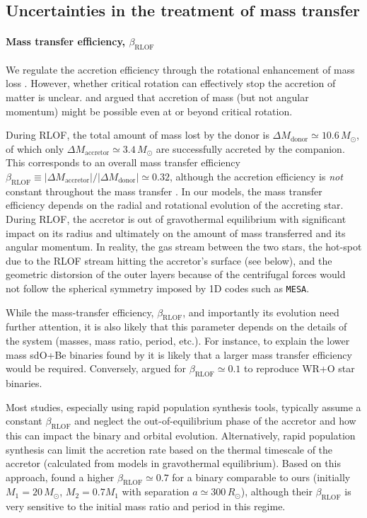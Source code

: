 \documentclass[twocolumn,twocolappendix,trackchanges]{aastex63}
\begin{document}
\subsection{Uncertainties in the treatment of mass transfer}
\label{sec:bin_param}

\paragraph{Mass transfer efficiency, $\beta_\mathrm{RLOF}$}
We regulate the accretion efficiency through the rotational
enhancement of mass loss \citep[e.g.,][]{langer:98, petrovic:05, wang:20}.  However, whether
critical rotation can effectively stop the accretion of matter is
unclear. \cite{popham:91} and \cite{paczynski:91} argued that
accretion of mass (but not angular momentum) might be possible even at
or beyond critical rotation.

During RLOF, the total amount of mass lost by the donor is
$\Delta M_\mathrm{donor} \simeq 10.6\,M_\odot$, of which only
$\Delta M_\mathrm{accretor}\simeq 3.4\,M_\odot$ are successfully
accreted by the companion. This corresponds to an overall mass
transfer efficiency
$\beta_\mathrm{RLOF}\equiv |\Delta M_\mathrm{accretor}|/|\Delta M_\mathrm{donor}| \simeq 0.32$,
although the accretion efficiency is \emph{not} constant throughout
the mass transfer \citep[e.g.,][]{vanrensbergen:06}. In our models,
the mass transfer efficiency depends on the radial and rotational
evolution of the accreting star. During RLOF, the accretor is out of
gravothermal equilibrium with significant impact on its radius and
ultimately on the amount of mass transferred and its angular
momentum. In reality, the gas stream between the two stars, the
hot-spot due to the RLOF stream hitting the accretor's surface (see
below), and the geometric distorsion of the outer layers because of
the centrifugal forces would not follow the spherical symmetry imposed
by 1D codes such as \texttt{MESA}.

While the mass-transfer efficiency, $\beta_\mathrm{RLOF}$, and
importantly its evolution need further attention, it is also
likely that this parameter depends on the details of
the system (masses, mass ratio, period, etc.). For instance, to
explain the lower mass sdO+Be binaries found by \cite{wang:21_sdOBe}
it is likely that a larger mass transfer efficiency would be
required. Conversely, \cite{petrovic:05} argued for
$\beta_\mathrm{RLOF}\simeq 0.1$ to reproduce WR+O star binaries.


Most studies, especially using rapid population synthesis tools,
typically assume a constant $\beta_\mathrm{RLOF}$ and neglect the
out-of-equilibrium phase of the accretor and how this can impact the
binary and orbital evolution. Alternatively, rapid population
synthesis can limit the accretion rate based on the thermal timescale
of the accretor (calculated from models in gravothermal
equilibrium). Based on this approach, \cite{schneider:15} found a
higher $\beta_\mathrm{RLOF}\simeq 0.7$ for a binary comparable to ours
(initially $M_1=20\,M_\odot$, $M_2=0.7M_1$ with separation
$a\simeq300\,R_\odot$), although their $\beta_\mathrm{RLOF}$ is very
sensitive to the initial mass ratio and period in this regime.
\end{document}
